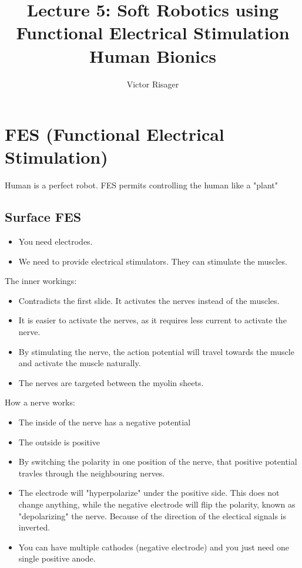 \documentclass[a4paper]{article}
\title{Lecture 5: Soft Robotics using Functional Electrical Stimulation \\
	\large Human Bionics}
\author{Victor Risager}
\begin{document}
\maketitle

\section{FES (Functional Electrical Stimulation)}
Human is a perfect robot. FES permits controlling the human like a "plant"

\subsection{Surface FES}
\begin{itemize}
	\item You need electrodes. 
	\item We need to provide electrical stimulators. They can stimulate the muscles.
\end{itemize}

The inner workings:
\begin{itemize}
	\item Contradicts the first slide. It activates the nerves instead of the muscles.  
	\item It is easier to activate the nerves, as it requires less current to activate the nerve. 
	\item By stimulating the nerve, the action potential will travel towards the muscle and activate the muscle naturally. 
	\item The nerves are targeted between the myolin sheets.

\end{itemize}
How a nerve works:
\begin{itemize}
	\item The inside of the nerve has a negative potential
	\item The outside is positive
	\item By switching the polarity in one position of the nerve, that positive potential travles through the neighbouring nerves. 
	\item The electrode will "hyperpolarize" under the positive side. This does not change anything, while the negative electrode will flip the polarity, known as "depolarizing" the nerve. Because of the direction of the electical signals is inverted. 
	\item You can have multiple cathodes (negative electrode) and you just need one single positive anode. 
\end{itemize}
\end{document}
